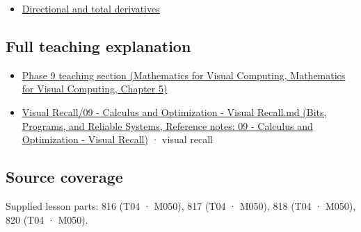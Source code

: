 \begin{itemize}
\tightlist
\item
  \hyperref[appendix-e2d476574aab]{Directional and total derivatives}
\end{itemize}

\subsection{Full teaching explanation}\label{appendix-677b59746ae0-full-teaching-explanation}

\begin{itemize}
\tightlist
\item
  \href{../02-Mathematics-for-Visual-Computing/main.pdf\#nameddest=02-foundations-ii-ch021-multivariable-derivatives-and-sensitivity-1}{Phase 9 teaching section (Mathematics for Visual Computing, Mathematics for Visual Computing, Chapter 5)}
\item
  \href{../01-Bits-Programs-and-Reliable-Systems/main.pdf\#nameddest=appendix-adf48f5dc5c1}{Visual Recall/09 - Calculus and Optimization - Visual Recall.md (Bits, Programs, and Reliable Systems, Reference notes: 09 - Calculus and Optimization - Visual Recall)} · visual recall
\end{itemize}

\subsection{Source coverage}\label{appendix-677b59746ae0-source-coverage}

Supplied lesson parts: 816 (T04 · M050), 817 (T04 · M050), 818 (T04 · M050), 820 (T04 · M050).
